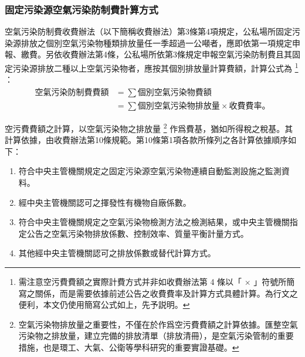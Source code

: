 \subsubsection{固定污染源空氣污染防制費計算方式}

空氣污染防制費收費辦法（以下簡稱收費辦法）第3條第4項規定，公私場所固定污染源排放之個別空氣污染物種類排放量任一季超過一公噸者，應即依第一項規定申報、繳費。另依收費辦法第4條，公私場所依第3條規定申報空氣污染防制費且其固定污染源排放二種以上空氣污染物者，應按其個別排放量計算費額，計算公式為
\footnote{需注意空污費費額之實際計費方式并非如收費辦法第 4 條以「 $\times$ 」符號所簡寫之關係，而是需要依據前述公告之收費費率及計算方式具體計算。為行文之便利，本文仍使用簡寫公式如上，先予説明。}
：
\begin{equation*}
   \begin{aligned}
     \text{空氣污染防制費費額}&=\sum \text{個別空氣污染物費額}\\
     &=\sum\text{個別空氣污染物排放量}\times \text{收費費率。}
   \end{aligned}
 \end{equation*}



空污費費額之計算，以空氣污染物之排放量
\footnote{空氣污染物排放量之重要性，不僅在於作爲空污費費額之計算依據。匯整空氣污染物之排放量，建立完備的排放清單（排放清冊），是空氣污染管制的重要措施，也是環工、大氣、公衛等學科研究的重要實證基礎。}
作爲費基，猶如所得稅之稅基。其計算依據，由收費辦法第10條規範。第10條第1項各款所條列之各計算依據順序如下：

\begin{enumerate}[itemsep=0em]
   \item 符合中央主管機關規定之固定污染源空氣污染物連續自動監測設施之監測資料。
   \item 經中央主管機關認可之揮發性有機物自廠係數。
   \item 符合中央主管機關規定之空氣污染物檢測方法之檢測結果，或中央主管機關指定公告之空氣污染物排放係數、控制效率、質量平衡計量方式。
   \item 其他經中央主管機關認可之排放係數或替代計算方式。
\end{enumerate}

